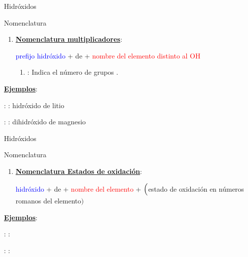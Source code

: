 \documentclass{beamer}
\begin{document}
\begin{frame}[t]{Hidróxidos}
    \begin{alertblock}{\Large Nomenclatura}\vspace*{5pt}
        \begin{enumerate}[label=\itembolascolor{\arabic*}{mDarkTeal}]
            \item \textbf{\uline{Nomenclatura multiplicadores}}:
                  \begin{center}
                      \textcolor{blue}{prefijo hidróxido} + de + \textcolor{red}{nombre del elemento distinto al OH}
                  \end{center}

                  \begin{enumerate}[label=\textcolor{red}{$\bullet$}]
                      \item {}: Indica el número de grupos .
                  \end{enumerate}
        \end{enumerate}

        \textbf{\uline{Ejemplos}}:

         : : hidróxido de litio

         : : dihidróxido de magnesio
    \end{alertblock}

\end{frame}

\begin{frame}[t]{Hidróxidos}
    \begin{alertblock}{\Large Nomenclatura}\vspace*{5pt}
        \begin{enumerate}[label=\itembolascolor{\arabic*}{mDarkTeal}]
            \addtocounter{enumi}{1}
            \item \textbf{\uline{Nomenclatura Estados de oxidación}}:
                  \begin{center}
                      \textcolor{blue}{hidróxido} + de + \textcolor{red}{nombre del elemento} + $\Bigl($\textcolor{green!50!black}{estado de oxidación en números romanos del elemento}$\Bigr)$
                  \end{center}
        \end{enumerate}
        \textbf{\uline{Ejemplos}}:

         : : 

         : : 
    \end{alertblock}
\end{frame}
\end{document}
